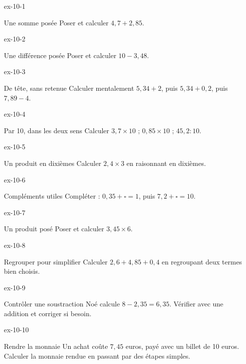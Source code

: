 \clearpage{}
\begin{blocLivre}{ex-10-1}\begin{exercice}[1]{Une somme posée}
Poser et calculer $4{,}7+2{,}85$.
\end{exercice}\end{blocLivre}
\begin{blocLivre}{ex-10-2}\begin{exercice}[1]{Une différence posée}
Poser et calculer $10-3{,}48$.
\end{exercice}\end{blocLivre}
\begin{blocLivre}{ex-10-3}\begin{exercice}[1]{De tête, sans retenue}
Calculer mentalement $5{,}34+2$, puis $5{,}34+0{,}2$, puis $7{,}89-4$.
\end{exercice}\end{blocLivre}
\begin{blocLivre}{ex-10-4}\begin{exercice}[1]{Par 10, dans les deux sens}
Calculer $3{,}7\times10$ ; $0{,}85\times10$ ; $45{,}2:10$.
\end{exercice}\end{blocLivre}
\begin{blocLivre}{ex-10-5}\begin{exercice}[1]{Un produit en dixièmes}
Calculer $2{,}4\times3$ en raisonnant en dixièmes.
\end{exercice}\end{blocLivre}

\begin{blocLivre}{ex-10-6}\begin{exercice}[2]{Compléments utiles}
Compléter : $0{,}35+\square=1$, puis $7{,}2+\square=10$.
\end{exercice}\end{blocLivre}
\begin{blocLivre}{ex-10-7}\begin{exercice}[2]{Un produit posé}
Poser et calculer $3{,}45\times6$.
\end{exercice}\end{blocLivre}
\begin{blocLivre}{ex-10-8}\begin{exercice}[2]{Regrouper pour simplifier}
Calculer $2{,}6+4{,}85+0{,}4$ en regroupant deux termes bien choisis.
\end{exercice}\end{blocLivre}
\begin{blocLivre}{ex-10-9}\begin{exercice}[2]{Contrôler une soustraction}
Noé calcule $8-2{,}35=6{,}35$. Vérifier avec une addition et corriger si besoin.
\end{exercice}\end{blocLivre}
\begin{blocLivre}{ex-10-10}\begin{exercice}[2]{Rendre la monnaie}
Un achat coûte $7{,}45$ euros, payé avec un billet de 10 euros. Calculer la monnaie rendue en passant par des étapes simples.
\end{exercice}\end{blocLivre}


